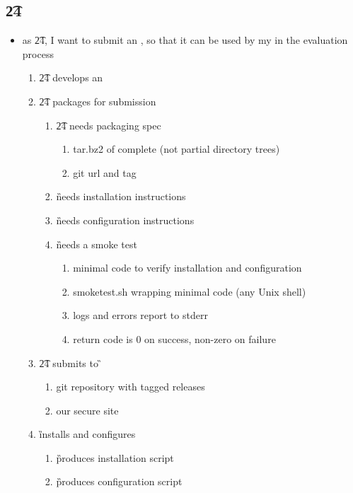 \documentclass[8pt,letterpaper]{article} %
\newenvironment{slimlist}{
  \begin{itemize}
    \setlength{\topsep}{0pt}
    \setlength{\itemsep}{1pt}
    \setlength{\parsep}{0pt}
    \setlength{\parskip}{0pt}
}{\end{itemize}}
\newenvironment{mitemize}[1]{
  \subsection*{#1}
  \begin{slimlist}
}{
\end{slimlist}
\vspace{1em}
\pagebreak
}
\begin{document}
\begin{comment}
    The return format should allow us to resolve gaps cleanly when possible. Also should be able to fairly skip missing \ds{s}.
  \end{quote}
\item unpack \ds for use by \tev or \sol if on disk at location

\item revise \ds
\begin{quote}
  we should not need to revise unless we allow for automatic registration and need to update look-up, this is likely a case that is so infrequent that it can be ignored. 
\end{quote}
\end{mitemize}
\end{comment}

\begin{mitemize}{\t24}
\item as \t24, I want to submit an \eng, so that it can be used by my  in the evaluation process
  \begin{enumerate}
  \item \t24 develops an \eng
  \item \t24 packages \eng for submission
    \begin{enumerate}
    \item \t24 needs packaging spec
      \begin{enumerate}
      \item tar.bz2 of complete \eng (not partial directory trees)
      \item git url and tag
      \end{enumerate}
    \item \G needs installation instructions
    \item \G needs configuration instructions
    \item \G needs a smoke test
      \begin{enumerate}
      \item minimal code to verify \eng installation and configuration
      \item smoketest.sh wrapping minimal code (any Unix shell)
      \item logs and errors report to stderr
      \item return code is 0 on success, non-zero on failure
      \end{enumerate}
    \end{enumerate}
  \item \t24 submits \eng to \G
    \begin{enumerate}
    \item git repository with tagged releases
    \item our secure site
    \end{enumerate}
  \item \G installs and configures \eng
    \begin{enumerate}
    \item \G produces \eng installation script
    \item \G produces \eng configuration script
    \end{enumerate}
  

\end{enumerate}
\end{mitemize}
\end{document}
